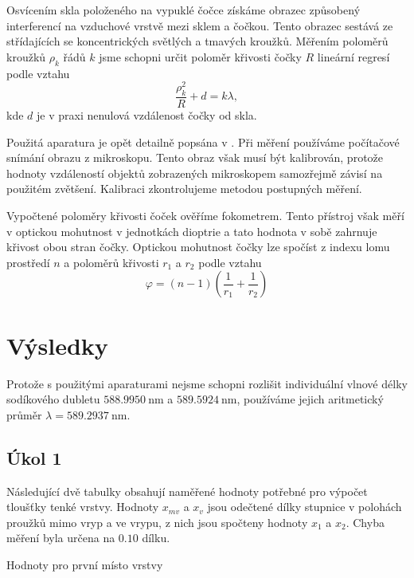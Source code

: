 \documentclass{protokol}
\begin{document}
      Osvícením skla položeného na vypuklé čočce získáme obrazec způsobený interferencí na vzduchové vrstvě mezi sklem a čočkou. Tento obrazec sestává ze střídajících se koncentrických světlých a tmavých kroužků. Měřením poloměrů kroužků $\rho_k$ řádů $k$ jsme schopni určit poloměr křivosti čočky $R$ lineární regresí podle vztahu
      \begin{equation} \label{eq:newton}
        \frac{\rho_k^2}{R} + d = k \lambda,
      \end{equation} 
      kde $d$ je v praxi nenulová vzdálenost čočky od skla.

      Použitá aparatura je opět detailně popsána v \cite{mereni}. Při měření používáme počítačové snímání obrazu z mikroskopu. Tento obraz však musí být kalibrován, protože hodnoty vzdáleností objektů zobrazených mikroskopem samozřejmě závisí na použitém zvětšení. Kalibraci zkontrolujeme metodou postupných měření.
      
      Vypočtené poloměry křivosti čoček ověříme fokometrem. Tento přístroj však měří v optickou mohutnost v jednotkách dioptrie a tato hodnota v sobě zahrnuje křivost obou stran čočky. Optickou mohutnost čočky lze spočíst z indexu lomu prostředí $n$ a poloměrů křivosti $r_1$ a $r_2$ podle vztahu
      \begin{equation} \label{eq:mohutnost}
        \varphi = (n - 1)(\frac{1}{r_1} + \frac{1}{r_2})
      \end{equation}

  \section*{Výsledky}

    Protože s použitými aparaturami nejsme schopni rozlišit individuální vlnové délky sodíkového dubletu $\SI{588.9950}{\nano\metre}$ a $\SI{589.5924}{\nano\metre}$, používáme jejich aritmetický průměr $\lambda = \SI{589.2937}{\nano\metre}$.

    \subsection*{Úkol 1} 
      
      Následující dvě tabulky obsahují naměřené hodnoty potřebné pro výpočet tloušťky tenké vrstvy. Hodnoty $x_{mv}$ a $x_{v}$ jsou odečtené dílky stupnice v polohách proužků mimo vryp a ve vrypu, z nich jsou spočteny hodnoty $x_1$ a $x_2$. Chyba měření byla určena na $\num{0.10}$ dílku.

      \begin{table}[H]
        \centering
        \setlength{\tabcolsep}{10pt}
        
        \caption{Hodnoty pro první místo vrstvy}
        \label{tab:vrstva1}
      \end{table}
      
\end{document}

